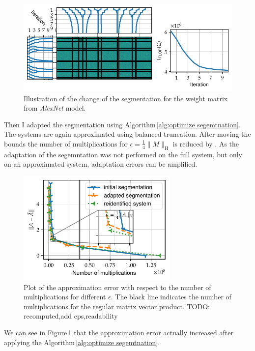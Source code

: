 \documentclass[doctype=mastersthesis,BCOR=15mm,biblatex]{ldvbook}%
\begin{document}
\begin{figure}[!htb]
	\centering
	\includegraphics[width=\textwidth]{Plots/move_example_alexnet_comp.pdf}
	\caption{Illustration of the change of the segmentation for the weight matrix from \emph{AlexNet} model.
	}
	\label{fig:alexnet_seperation_comp}
\end{figure}
Then I adapted the segmentation using Algorithm\,\ref{alg:optimize segemtnation}.
The systems are again approximated using balanced truncation.
After moving the bounds the number of multiplications for $\epsilon = \frac{1}{4}\|M\|_\text{H}$ is reduced by .
As the adaptation of the segemntation was not performed on the full system, but only on an approximated system, adaptation errors can be amplified.
\begin{figure}[!htb]
	\centering
	\includegraphics[width=0.7\textwidth]{Plots/move_example_alexnet_error.pdf}
	\caption{Plot of the approximation error with respect to the number of multiplications for different $\epsilon$. 
		The black line indicates the number of multiplications for the regular matrix vector product. 
		TODO: recomputed,add eps,readability
	}
	\label{fig:allexnet_err_cost}
\end{figure}
We can see in Figure\,\ref{fig:alexnet_seperation_comp} that the approximation error actually increased after applying the Algorithm\,\ref{alg:optimize segemtnation}.
\end{document}
